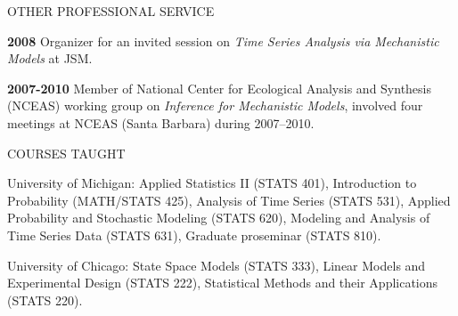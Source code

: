 \begin{mylist}{OTHER PROFESSIONAL SERVICE}
\item{\bf 2008 } Organizer for an invited session on {\it Time Series Analysis via Mechanistic Models} at JSM.

\item {\bf 2007-2010 } Member of National Center for Ecological Analysis and Synthesis (NCEAS) working group on {\it Inference for Mechanistic Models}, involved four meetings at NCEAS (Santa Barbara) during 2007--2010.
 




\end{mylist}


\lsp


\begin{mylist}{COURSES TAUGHT}

\item{University of Michigan}: 
Applied Statistics II (STATS 401), 
Introduction to Probability (MATH/STATS 425), 
Analysis of Time Series (STATS 531), 
Applied Probability and Stochastic Modeling (STATS 620),
Modeling and Analysis of Time Series Data (STATS 631),
Graduate proseminar (STATS 810).

\item{University of Chicago}: State Space
Models (STATS 333), Linear Models and Experimental Design (STATS 222),
Statistical Methods and their Applications (STATS 220). 

\end{mylist}

\lsp

